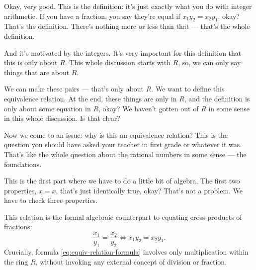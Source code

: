 \begin{speech}[00:41:05 - 00:43:24]
Okay, very good. This is the definition:  it's just exactly what you do with integer arithmetic. If you have a fraction, you say they're equal if $x_1 y_2 = x_2 y_1$, okay? That's the definition. There's nothing more or less than that --- that's the whole definition.

And it's motivated by the integers. It's very important for this definition that this is only about $R$.  This whole discussion starts with $R$, so, we can only say things that are about $R$.

We can make these pairs --- that's only about $R$. We want to define this equivalence relation. At the end, these things are only in $R$, and the definition is only about some equation in $R$, okay? We haven't gotten out of $R$ in some sense in this whole discussion. Is that clear?

Now we come to an issue: why is this an equivalence relation? This is the question you should have asked your teacher in first grade or whatever it was. That's like the whole question about the rational numbers in some sense --- the foundations.

This is the first part where we have to do a little bit of algebra. The first two properties, $x = x$, that's just identically true, okay? That's not a problem. We have to check three properties. 
\end{speech}

\begin{content}

\begin{steps}
This relation is the formal algebraic counterpart to equating cross-products of fractions:
\[
\frac{x_1}{y_1} = \frac{x_2}{y_2} \iff x_1 y_2 = x_2 y_1.
\]
Crucially, formula \eqref{eq:equiv-relation-formula} involves only multiplication within the ring $R$, without invoking any external concept of division or fraction.
\end{steps}
\end{content}

